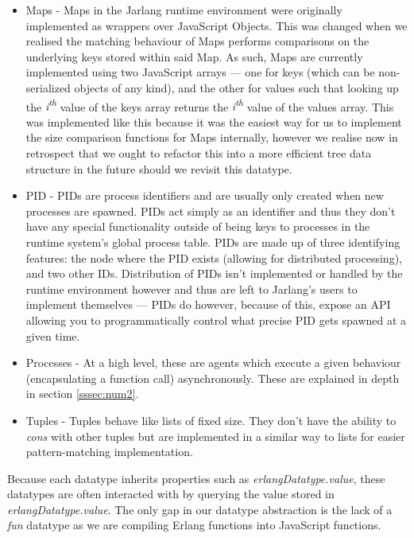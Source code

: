 \documentclass[twoside,12pt,titlepage,a4paper]{article}
\begin{document}
\begin{itemize}
	\item Maps - Maps in the Jarlang runtime environment were originally implemented as wrappers over JavaScript Objects. This was changed when we realised the matching behaviour of Maps performs comparisons on the underlying keys stored within said Map. As such, Maps are currently implemented using two JavaScript arrays --- one for keys (which can be non-serialized objects of any kind), and the other for values such that looking up the \textit{i\textsuperscript{th}} value of the keys array returns the \textit{i\textsuperscript{th}} value of the values array. This was implemented like this because it was the easiest way for us to implement the size comparison functions for Maps internally, however we realise now in retrospect that we ought to refactor this into a more efficient tree data structure in the future should we revisit this datatype.
			
	\item PID - PIDs are process identifiers and are usually only created when new processes are spawned. PIDs act simply as an identifier and thus they don't have any special functionality outside of being keys to processes in the runtime system's global process table. PIDs are made up of three identifying features: the node where the PID exists (allowing for distributed processing), and two other IDs. Distribution of PIDs isn't implemented or handled by the runtime environment however and thus are left to Jarlang's users to implement themselves --- PIDs do however, because of this, expose an API allowing you to programmatically control what precise PID gets spawned at a given time.
			
	\item Processes - At a high level, these are agents which execute a given behaviour (encapsulating a function call) asynchronously. These are explained in depth in section \ref{sssec:num2}.
			
	\item Tuples - Tuples behave like lists of fixed size. They don't have the ability to \textit{cons} with other tuples but are implemented in a similar way to lists for easier pattern-matching implementation.
			
\end{itemize}

Because each datatype inherits properties such as \textit{erlangDatatype.value}, these datatypes are often interacted with by querying the value stored in \textit{erlangDatatype.value}. The only gap in our datatype abstraction is the lack of a \textit{fun} datatype as we are compiling Erlang functions into JavaScript functions. 
\end{document}
